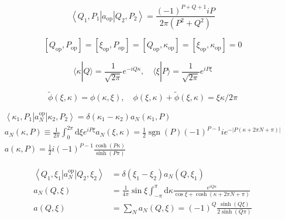 \documentclass[main.tex]{subfiles}
\begin{document}
\begin{equation}\label{16.37}
	\left\langle Q_{1}, P_{1}\left|a_{\mathrm{op}}\right| Q_{2}, P_{2}\right\rangle=\frac{(-1)^{P+Q+1} i P}{2 \pi\left(P^{2}+Q^{2}\right)}
\end{equation}







\begin{equation}\label{16.43}
	\left[Q_{\mathrm{op}}, P_{\mathrm{op}}\right]=\left[\xi_{\mathrm{op}}, P_{\mathrm{op}}\right]=\left[Q_{\mathrm{op}}, \kappa_{\mathrm{op}}\right]=\left[\xi_{\mathrm{op}}, \kappa_{\mathrm{op}}\right]=0
\end{equation}



\begin{equation}\label{16.44}
	\langle\kappa | Q\rangle=\frac{1}{\sqrt{2 \pi}} e^{-i Q \kappa}, \quad\langle\xi | P\rangle=\frac{1}{\sqrt{2 \pi}} e^{i P \xi}
\end{equation}



\begin{equation}\label{16.45}
	\tilde{\phi}(\xi, \kappa)=\phi(\kappa, \xi), \quad \phi(\xi, \kappa)+\tilde{\phi}(\xi, \kappa)=\xi \kappa / 2 \pi
\end{equation}







\begin{equation}\label{16.47}
	\begin{array}{l}
{\left\langle\kappa_{1}, P_{1}\left|a_{N}^{\mathrm{op}}\right| \kappa_{2}, P_{2}\right\rangle=\delta\left(\kappa_{1}-\kappa_{2}\right) a_{N}\left(\kappa_{1}, P\right)} \\
{a_{N}(\kappa, P) \equiv \frac{1}{2 \pi} \int_{0}^{2 \pi} \mathrm{d} \xi e^{i P \xi} a_{N}(\xi, \kappa)=\frac{1}{2} \operatorname{sgn}(P)(-1)^{P-1} i e^{-|P(\kappa+2 \pi N+\pi)|}} \\
{a(\kappa, P)=\frac{1}{2} i(-1)^{P-1} \frac{\cosh (P \kappa)}{\sinh (P \pi)}}
\end{array}
\end{equation}



\begin{equation}\label{16.48}
\begin{aligned}
\left\langle Q_{1}, \xi_{1}\left|a_{N}^{\mathrm{op}}\right| Q_{2}, \xi_{2}\right\rangle &=\delta\left(\xi_{1}-\xi_{2}\right) a_{N}\left(Q, \xi_{1}\right) \\
a_{N}(Q, \xi) &=\frac{1}{4 \pi} \sin \xi \int_{-\pi}^{\pi} \mathrm{d} \kappa \frac{e^{i Q \kappa} }{\cos \xi+\cosh (\kappa+2 \pi N+\pi)} \\
a(Q, \xi) &=\sum_{N} a_{N}(Q, \xi)=(-1)^{Q} \frac{\sinh (Q \xi)}{2 \sinh (Q \pi)}
\end{aligned}
\end{equation}
\end{document}
